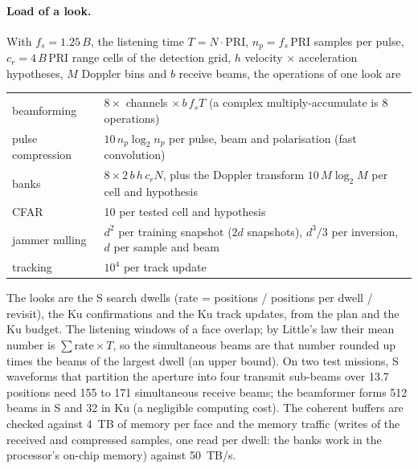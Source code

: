 \documentclass[11pt,a4paper]{article}
\begin{document}
\paragraph{Load of a look.} With $f_s = 1.25\,B$, the listening time $T = N\cdot\mathrm{PRI}$, $n_p = f_s\,\mathrm{PRI}$
samples per pulse, $c_r = 4\,B\,\mathrm{PRI}$ range cells of the detection grid, $h$ velocity $\times$ acceleration
hypotheses, $M$ Doppler bins and $b$ receive beams, the operations of one look are
\begin{center}
\begin{tabularx}{\linewidth}{@{}lL@{}}
\toprule
beamforming & $8\times$ channels $\times\, b\, f_s T$ (a complex multiply-accumulate is 8 operations)\\
pulse compression & $10\, n_p\log_2 n_p$ per pulse, beam and polarisation (fast convolution)\\
banks & $8\times 2\, b\, h\, c_r N$, plus the Doppler transform $10\,M\log_2 M$ per cell and hypothesis\\
CFAR & 10 per tested cell and hypothesis\\
jammer nulling & $d^2$ per training snapshot ($2d$ snapshots), $d^3/3$ per inversion, $d$ per sample and beam\\
tracking & $10^4$ per track update\\
\bottomrule
\end{tabularx}
\end{center}
The looks are the S search dwells (rate = positions / positions per dwell / revisit), the Ku confirmations and the Ku
track updates, from the plan and the Ku budget. The listening windows of a face overlap; by Little's law their mean
number is $\sum \text{rate}\times T$, so the simultaneous beams are that number rounded up times the beams of the
largest dwell (an upper bound). On two test missions, S waveforms that partition the aperture into four
transmit sub-beams over 13.7 positions need 155 to 171 simultaneous receive beams; the beamformer forms 512 beams in
S and 32 in Ku (a negligible computing cost). The coherent buffers are checked against \SI{4}{TB} of memory per face and the memory traffic (writes of the
received and compressed samples, one read per dwell: the banks work in the processor's on-chip memory) against
\SI{50}{TB/s}.
\end{document}
